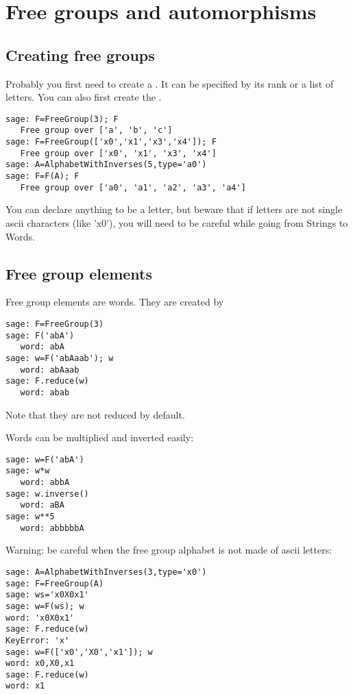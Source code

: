 \documentclass[10pt,a4paper]{article}
\begin{document}
\section{Free groups and automorphisms}

\subsection{Creating free groups}

Probably you first need to create a . It can be specified by
its rank or a list of letters. You can also first create the .
\begin{verbatim}
sage: F=FreeGroup(3); F
   Free group over ['a', 'b', 'c']
sage: F=FreeGroup(['x0','x1','x3','x4']); F
   Free group over ['x0', 'x1', 'x3', 'x4']
sage: A=AlphabetWithInverses(5,type='a0')
sage: F=F(A); F
   Free group over ['a0', 'a1', 'a2', 'a3', 'a4']
\end{verbatim}
You can declare anything to be a letter, but beware that if letters are
not single ascii characters (like 'x0'), you will need to be careful
while going from Strings to Words.

\subsection{Free group elements}

Free group elements are words. They are created by
\begin{verbatim}
sage: F=FreeGroup(3)
sage: F('abA')
   word: abA
sage: w=F('abAaab'); w
   word: abAaab
sage: F.reduce(w)
   word: abab
\end{verbatim} 
Note that they are not reduced by default. 

Words can be multiplied and inverted easily:

\begin{verbatim}
sage: w=F('abA')
sage: w*w
   word: abbA
sage: w.inverse()
   word: aBA
sage: w**5
   word: abbbbbA
\end{verbatim}

Warning: be careful when the free group alphabet is not made of ascii letters:

\begin{verbatim}
sage: A=AlphabetWithInverses(3,type='x0')
sage: F=FreeGroup(A)
sage: ws='x0X0x1'
sage: w=F(ws); w
word: 'x0X0x1'
sage: F.reduce(w)
KeyError: 'x'
sage: w=F(['x0','X0','x1']); w
word: x0,X0,x1
sage: F.reduce(w)
word: x1
\end{verbatim}
\end{document}
